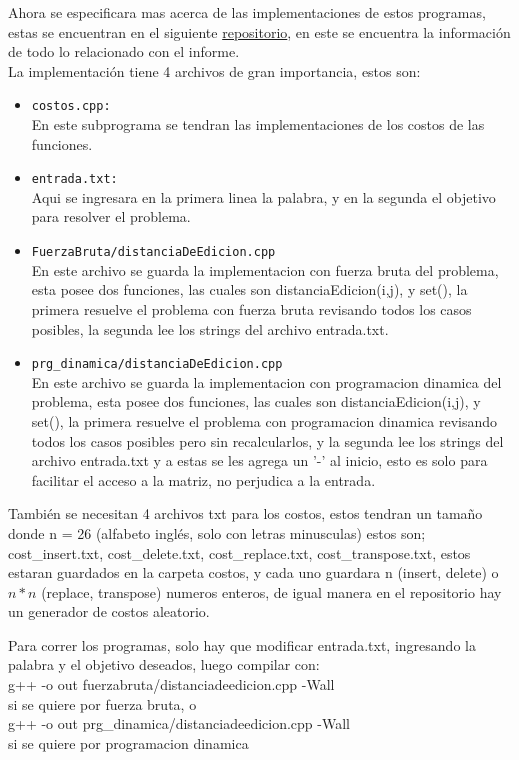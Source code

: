 Ahora se especificara mas acerca de las implementaciones de estos programas, estas se encuentran en el siguiente \href{https://github.com/Mappo1562/DistanciaMinimaDeEdicionExtendida}{repositorio}, en este se encuentra la información de todo lo relacionado con el informe.\\
La implementación tiene 4 archivos de gran importancia, estos son:
\begin{itemize}
    \item \texttt{costos.cpp:}\\ En este subprograma se tendran las implementaciones de los costos de las funciones.
    \item \texttt{entrada.txt:}\\ Aqui se ingresara en la primera linea la palabra, y en la segunda el objetivo para resolver el problema.
    \item \texttt{FuerzaBruta/distanciaDeEdicion.cpp}\\ En este archivo se guarda la implementacion con fuerza bruta del problema, esta posee dos funciones, las cuales son distanciaEdicion(i,j), y set(), la primera resuelve el problema con fuerza bruta revisando todos los casos posibles, la segunda lee los strings del archivo entrada.txt.
    \item \texttt{prg\_dinamica/distanciaDeEdicion.cpp}\\ En este archivo se guarda la implementacion con programacion dinamica del problema, esta posee dos funciones, las cuales son distanciaEdicion(i,j), y set(), la primera resuelve el problema con programacion dinamica revisando todos los casos posibles pero sin recalcularlos, y la segunda lee los strings del archivo entrada.txt y a estas se les agrega un '-' al inicio, esto es solo para facilitar el acceso a la matriz, no perjudica a la entrada.
\end{itemize}

También se necesitan 4 archivos txt para los costos, estos tendran un tamaño donde n = 26 (alfabeto inglés, solo con letras minusculas) estos son; cost\_insert.txt, cost\_delete.txt, cost\_replace.txt, cost\_transpose.txt, estos estaran guardados en la carpeta costos, y cada uno guardara n (insert, delete) o $n*n$ (replace, transpose) numeros enteros, de igual manera en el repositorio hay un generador de costos aleatorio.


Para correr los programas, solo hay que modificar entrada.txt, ingresando la palabra y el objetivo deseados, luego compilar con:\\
g++ -o out fuerzabruta/distanciadeedicion.cpp -Wall\\
si se quiere por fuerza bruta, o\\
g++ -o out prg\_dinamica/distanciadeedicion.cpp -Wall\\
si se quiere por programacion dinamica